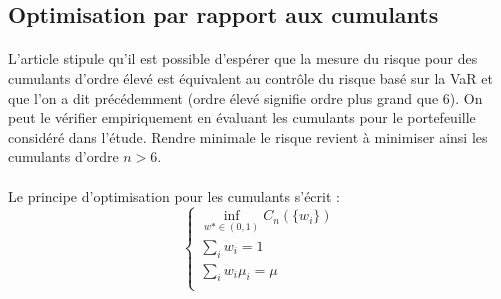 \documentclass{article}
\begin{document}
      \subsection{Optimisation par rapport aux cumulants}
\paragraph{}      
      L'article stipule qu'il est possible d'espérer que la mesure du risque pour des cumulants d'ordre élevé est équivalent au contrôle du risque basé sur la VaR et que l'on a dit précédemment (ordre élevé signifie ordre plus grand que $6$). On peut le vérifier empiriquement en évaluant les cumulants pour le portefeuille considéré dans l'étude. Rendre minimale le risque revient à minimiser ainsi les cumulants d'ordre $n>6$.
    \paragraph{}
     Le principe d'optimisation pour les cumulants s'écrit :
       \begin{equation}
  \left\{
      \begin{aligned}
     \inf_{w*\in {(0,1)}}C_{n}(\lbrace w_{i}\rbrace )\\
     \sum _{i} w_{i}=1\\
     \sum _{i} w_{i}\mu_{i}=\mu\\
      \end{aligned}
    \right.
\end{equation} 
    
\end{document}
